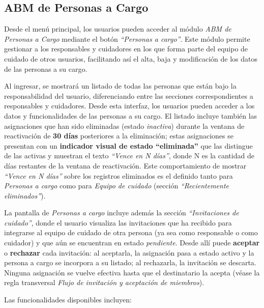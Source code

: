 \documentclass[a4paper,12pt]{article}
\begin{document}
    \subsection{ABM de Personas a Cargo}
    \par Desde el menú principal, los usuarios pueden acceder al módulo \textit{ABM de Personas a Cargo} mediante el botón \textit{“Personas a cargo”}. Este módulo permite gestionar a los responsables y cuidadores en los que forma parte del equipo de cuidado de otros usuarios, facilitando así el alta, baja y modificación de los datos de las personas a su cargo.
    \par Al ingresar, se mostrará un listado de todas las personas que están bajo la responsabilidad del usuario, diferenciando entre las secciones correspondientes a responsables y cuidadores. Desde esta interfaz, los usuarios pueden acceder a los datos y funcionalidades de las personas a su cargo. El listado incluye también las asignaciones que han sido eliminadas (estado \textit{inactiva}) durante la ventana de reactivación de \textbf{30 días} posteriores a la eliminación; estas asignaciones se presentan con un \textbf{indicador visual de estado “eliminada”} que las distingue de las activas y muestran el texto \textit{“Vence en N días”}, donde N es la cantidad de días restantes de la ventana de reactivación. Este comportamiento de mostrar \textit{“Vence en N días”} sobre los registros eliminados es el definido tanto para \textit{Personas a cargo} como para \textit{Equipo de cuidado} (sección \textit{``Recientemente eliminados''}).
    \par La pantalla de \textit{Personas a cargo} incluye además la sección \textit{``Invitaciones de cuidado''}, donde el usuario visualiza las invitaciones que ha recibido para integrarse al equipo de cuidado de otra persona (ya sea como responsable o como cuidador) y que aún se encuentran en estado \textit{pendiente}. Desde allí puede \textbf{aceptar} o \textbf{rechazar} cada invitación: al aceptarla, la asignación pasa a estado activo y la persona a cargo se incorpora a su listado; al rechazarla, la invitación se descarta. Ninguna asignación se vuelve efectiva hasta que el destinatario la acepta (véase la regla transversal \textit{Flujo de invitación y aceptación de miembros}).
    \par Las funcionalidades disponibles incluyen:
\end{document}
